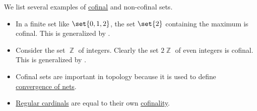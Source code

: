 \begin{example}\label{ex:def:cofinal_set}
  We list several examples of \hyperref[def:cofinal_set]{cofinal} and non-cofinal sets.

  \begin{itemize}
    \item In a finite set like \( \set{ 0, 1, 2 } \), the set \( \set{ 2 } \) containing the maximum is cofinal. This is generalized by .

    \item Consider the set \( \BbbZ \) of integers. Clearly the set \( 2\BbbZ \) of even integers is cofinal. This is generalized by .

    \item Cofinal sets are important in topology because it is used to define \hyperref[def:net_convergence]{convergence of nets}.

    \item \hyperref[def:regular_cardinal]{Regular cardinals} are equal to their own \hyperref[def:cofinality]{cofinality}.
  \end{itemize}
\end{example}
